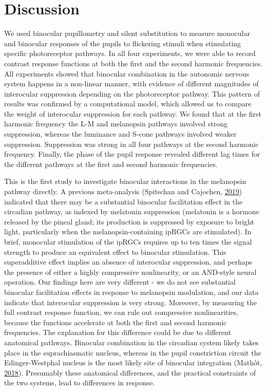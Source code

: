 \documentclass[
]{article}
\begin{document}
\hypertarget{discussion}{%
\section{Discussion}\label{discussion}}

We used binocular pupillometry and silent substitution to measure monocular and binocular responses of the pupils to flickering stimuli when stimulating specific photoreceptor pathways. In all four experiments, we were able to record contrast response functions at both the first and the second harmonic frequencies. All experiments showed that binocular combination in the autonomic nervous system happens in a non-linear manner, with evidence of different magnitudes of interocular suppression depending on the photoreceptor pathway. This pattern of results was confirmed by a computational model, which allowed us to compare the weight of interocular suppression for each pathway. We found that at the first harmonic frequency the L-M and melanopsin pathways involved strong suppression, whereas the luminance and S-cone pathways involved weaker suppression. Suppression was strong in all four pathways at the second harmonic frequency. Finally, the phase of the pupil response revealed different lag times for the different pathways at the first and second harmonic frequencies.

This is the first study to investigate binocular interactions in the melanopsin pathway directly. A previous meta-analysis (Spitschan and Cajochen, \protect\hyperlink{ref-Spitschan2019}{2019}) indicated that there may be a substantial binocular facilitation effect in the circadian pathway, as indexed by melatonin suppression (melatonin is a hormone released by the pineal gland; its production is suppressed by exposure to bright light, particularly when the melanopsin-containing ipRGCs are stimulated). In brief, monocular stimulation of the ipRGCs requires up to ten times the signal strength to produce an equivalent effect to binocular stimulation. This superadditive effect implies an absence of interocular suppression, and perhaps the presence of either a highly compressive nonlinearity, or an AND-style neural operation. Our findings here are very different - we do not see substantial binocular facilitation effects in response to melanopsin modulation, and our data indicate that interocular suppression is very strong. Moreover, by measuring the full contrast response function, we can rule out compressive nonlinearities, because the functions accelerate at both the first and second harmonic frequencies. The explanation for this difference could be due to different anatomical pathways. Binocular combination in the circadian system likely takes place in the suprachiasmatic nucleus, whereas in the pupil constriction circuit the Edinger-Westphal nucleus is the most likely site of binocular integration (Mathôt, \protect\hyperlink{ref-Mathot2018}{2018}). Presumably these anatomical differences, and the practical constraints of the two systems, lead to differences in response.
\end{document}
